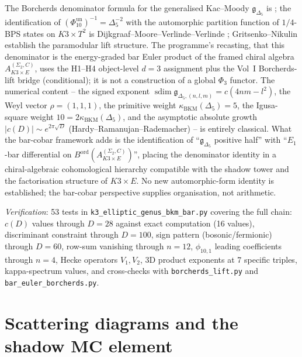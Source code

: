 \begin{remark}
\label{rem:k3e-bar-euler-bkm-chain-classical}
The Borcherds denominator formula for the generalised
Kac--Moody $\mathfrak{g}_{\Delta_5}$ is \cite{Borcherds1992,Borcherds1998};
the identification of \((\Phi_{10}^{\mathrm{un}})^{-1}=\Delta_5^{-2}\)
with the automorphic partition function of $1/4$-BPS states on
$K3 \times T^2$ is Dijkgraaf--Moore--Verlinde--Verlinde
\cite{DMVV}; Gritsenko--Nikulin
\cite{GritsenkoNikulin1995,GritsenkoNikulin1998} establish the paramodular
lift structure. The programme's recasting, that this denominator is the
energy-graded bar Euler product of the framed chiral algebra
$A_{K3 \times E}^{(\Sigma_2,C)}$, uses the H1--H4 object-level
$d=3$ assignment plus the Vol~I Borcherds-lift bridge (conditional);
	it is not a construction of a global $\Phi_3$ functor. The numerical content
	-- the signed exponent
	\(\operatorname{sdim}\mathfrak g_{\Delta_5,(n,l,m)}=c(4nm-l^2)\),
	the Weyl vector $\rho = (1,1,1)$, the primitive weight
	$\kappa_{\mathrm{BKM}}(\Delta_5)=5$, the Igusa-square weight
	$10 = 2 \kappa_{\mathrm{BKM}}(\Delta_5)$, and the asymptotic absolute
	growth $|c(D)| \sim e^{2\pi\sqrt{D}}$ (Hardy--Ramanujan--Rademacher)
	-- is entirely classical. What the bar-cobar framework adds is the
identification of ``$\mathfrak{g}_{\Delta_5}$ positive half'' with
``$E_1$-bar differential on
$B^{\mathrm{ord}}(A_{K3 \times E}^{(\Sigma_2,C)})$'',
placing the denominator identity in a chiral-algebraic cohomological
hierarchy compatible with the shadow tower and the factorisation
structure of $K3 \times E$. No new automorphic-form identity is
established; the bar-cobar perspective supplies organisation, not
arithmetic.
\end{remark}

\noindent\textit{Verification}: 53 tests in
\texttt{k3\_elliptic\_genus\_bkm\_bar.py} covering the full chain:
$c(D)$ values through $D = 28$ against exact computation (16 values),
discriminant constraint through $D = 100$,
sign pattern (bosonic/fermionic) through $D = 60$,
row-sum vanishing through $n = 12$,
$\phi_{10,1}$ leading coefficients through $n = 4$,
Hecke operators $V_1, V_2$,
3D product exponents at 7 specific triples,
kappa-spectrum values,
and cross-checks with \texttt{borcherds\_lift.py}
and \texttt{bar\_euler\_borcherds.py}.


\section{Scattering diagrams and the shadow MC element}
\label{sec:k3e-scattering}

